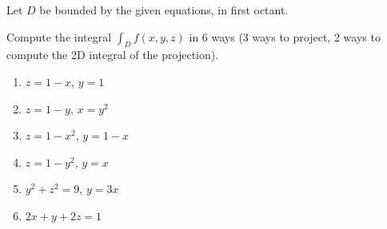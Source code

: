 \begin{exercise}
    Let $D$ be bounded by the given equations, in first octant. 

    Compute the integral $\int_D f(x, y, z)$ in 6 ways (3 ways to project, 2 ways to compute the 2D integral of the projection). 

    \begin{minipage}[t]{0.45\linewidth}
        \begin{enumerate}
            \item $z = 1 - x$, $y = 1$
            \item $z = 1 - y$, $x = y^2$
            \item $z = 1 - x^2$, $y = 1 - x$
        \end{enumerate}
    \end{minipage}
    \begin{minipage}[t]{0.45\linewidth}
        \begin{enumerate} \setcounter{enumi}{3}
            \item $z = 1 - y^2$, $y = x$
            \item $y^2 + z^2 = 9$, $y = 3x$
            \item $2x + y + 2z = 1$
        \end{enumerate}
    \end{minipage}
\end{exercise}